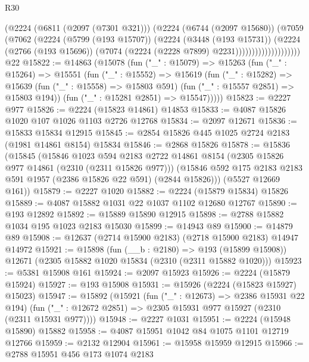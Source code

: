 \begin{lexlean}{R30}
\begin{coremodule}
                          (@2224
                            (@6811 (@2097 (@7301 @321)))
                            (@2224
                              (@6744 (@2097 @15680))
                              (@7059
                                (@7062
                                  (@2224
                                    (@5799 (@193 @15707))
                                    (@2224
                                      (@3448 (@193 @15731))
                                      (@2224
                                        (@2766 (@193 @15696))
                                        (@7074 (@2224 (@2228 @7899) @2231))))))))))))))))))))
    @22
@15822 := @14863
    (@15078
      (fun ("_" : @15079) =>
      @15263
        (fun ("_" : @15264) =>
        @15551
          (fun ("_" : @15552) =>
          @15619
            (fun ("_" : @15282) =>
            @15639 (fun ("_" : @15558) => @15803 @591) (fun ("_" : @15557 @2851) => @15803 @194))
            (fun ("_" : @15281 @2851) => @15547)))))
@15823 := @2227 @977
@15826 := @2224 (@15823 @14861) @14853
@15833 := @4087 @15826 @1020 @107 @1026 @1103 @2726 @12768
@15834 := @2097 @12671
@15836 := @15833 @15834 @12915
@15845 := @2854 @15826 @445 @1025 @2724 @2183 (@1981 @14861 @8154) @15834
@15846 := @2868 @15826
@15878 := @15836
    (@15845
      (@15846
        @1023
        @594
        @2183
        @2722
        @14861
        @8154
        (@2305 @15826 @977 @14861 (@2310 (@2311 @15826 @977)))
        (@15846 @592 @175 @2183 @2183 @591 @1957 (@2386 @15826 @22 @591) (@2844 @15826)))
      (@5527 @12669 @161))
@15879 := @2227 @1020
@15882 := @2224 (@15879 @15834) @15826
@15889 := @4087 @15882 @1031 @22 @1037 @1102 @12680 @12767
@15890 := @193 @12892
@15892 := @15889 @15890 @12915
@15898 := @2788 @15882 @1034 @195 @1023 @2183 @15030
@15899 := @14943 @89
@15900 := @14879 @89
@15908 := @12637 (@2714 @15900 @2183) (@2718 @15900 @2183) @14947 @14972
@15921 := @15898
    (fun (__b : @2180) => @193 (@15899 @15908))
    @12671
    (@2305 @15882 @1020 @15834 (@2310 (@2311 @15882 @1020)))
@15923 := @5381 @15908 @161
@15924 := @2097 @15923
@15926 := @2224 (@15879 @15924)
@15927 := @193 @15908
@15931 := @15926 (@2224 (@15823 @15927) @15023)
@15947 := @15892
    (@15921
      (fun ("_" : @12673) => @2386 @15931 @22 @194)
      (fun ("_" : @12672 @2851) => @2305 @15931 @977 @15927 (@2310 (@2311 @15931 @977))))
@15948 := @2227 @1031
@15951 := @2224 (@15948 @15890) @15882
@15958 := @4087 @15951 @1042 @84 @1075 @1101 @12719 @12766
@15959 := @2132 @12904
@15961 := @15958 @15959 @12915
@15966 := @2788 @15951 @456 @173 @1074 @2183

\end{coremodule}
\end{lexlean}
